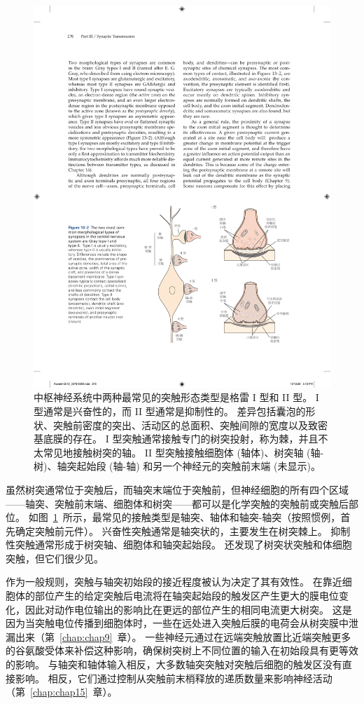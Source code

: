 \begin{figure}[htbp]
	\centering
	\includegraphics[width=0.8\linewidth]{chap13/fig_13_2}
	\caption{中枢神经系统中两种最常见的突触形态类型是格雷 I 型和 II 型。
		I 型通常是兴奋性的，而 II 型通常是抑制性的。
		差异包括囊泡的形状、突触前密度的突出、活动区的总面积、突触间隙的宽度以及致密基底膜的存在。
		I 型突触通常接触专门的树突投射，称为棘，并且不太常见地接触树突的轴。
		II 型突触接触细胞体 (轴体)、树突轴 (轴-树)、轴突起始段 (轴-轴) 和另一个神经元的突触前末端 (未显示)。}
	\label{fig:13_2}
\end{figure}


虽然树突通常位于突触后，而轴突末端位于突触前，但神经细胞的所有四个区域——轴突、突触前末端、细胞体和树突——都可以是化学突触的突触前或突触后部位。
如图~\ref{fig:13_2}~所示，最常见的接触类型是轴突、轴体和轴突-轴突（按照惯例，首先确定突触前元件）。
兴奋性突触通常是轴突状的，主要发生在树突棘上。
抑制性突触通常形成于树突轴、细胞体和轴突起始段。
还发现了树突状突触和体细胞突触，但它们很少见。


作为一般规则，突触与轴突初始段的接近程度被认为决定了其有效性。
在靠近细胞体的部位产生的给定突触后电流将在轴突起始段的触发区产生更大的膜电位变化，因此对动作电位输出的影响比在更远的部位产生的相同电流更大树突。
这是因为当突触电位传播到细胞体时，一些在远处进入突触后膜的电荷会从树突膜中泄漏出来（第~\ref{chap:chap9}~章）。
一些神经元通过在远端突触放置比近端突触更多的谷氨酸受体来补偿这种影响，确保树突树上不同位置的输入在初始段具有更等效的影响。
与轴突和轴体输入相反，大多数轴突突触对突触后细胞的触发区没有直接影响。
相反，它们通过控制从突触前末梢释放的递质数量来影响神经活动（第~\ref{chap:chap15}~章）。



